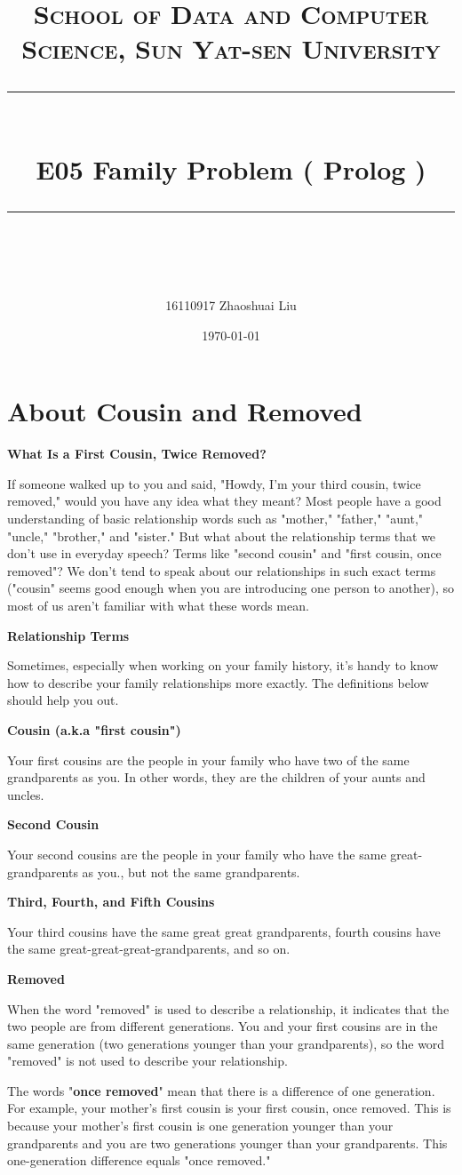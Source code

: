 ﻿\documentclass[a4paper, 11pt]{article}
\title{	
\normalfont \normalsize
\textsc{School of Data and Computer Science, Sun Yat-sen University} \\ [25pt] %
\rule{\textwidth}{0.5pt} \\[0.4cm] %
\huge  E05 Family Problem ( Prolog )\\ %
\rule{\textwidth}{2pt} \\[0.5cm] %
\author{16110917 Zhaoshuai Liu}
\date{\normalsize\today}
}
\begin{document}
\maketitle
\tableofcontents
\newpage
\section{About Cousin and Removed}
\textbf{What Is a First Cousin, Twice Removed?}

If someone walked up to you and said, "Howdy, I'm your third cousin, twice removed," would you have any idea what they meant? Most people have a good understanding of basic relationship words such as "mother," "father," "aunt," "uncle," "brother," and "sister." But what about the relationship terms that we don't use in everyday speech? Terms like "second cousin" and "first cousin, once removed"? We don't tend to speak about our relationships in such exact terms ("cousin" seems good enough when you are introducing one person to another), so most of us aren't familiar with what these words mean.

\textbf{Relationship Terms}

Sometimes, especially when working on your family history, it's handy to know how to describe your family relationships more exactly. The definitions below should help you out.

\textbf{Cousin (a.k.a "first cousin")}

Your first cousins are the people in your family who have two of the same grandparents as you. In other words, they are the children of your aunts and uncles.

\textbf{Second Cousin}

Your second cousins are the people in your family who have the same great-grandparents as you., but not the same grandparents.

\textbf{Third, Fourth, and Fifth Cousins}

Your third cousins have the same great great grandparents, fourth cousins have the same great-great-great-grandparents, and so on.

\textbf{Removed}

When the word "removed" is used to describe a relationship, it indicates that the two people are from different generations. You and your first cousins are in the same generation (two generations younger than your grandparents), so the word "removed" is not used to describe your relationship.

The words "\textbf{once removed}" mean that there is a difference of one generation. For example, your mother's first cousin is your first cousin, once removed. This is because your mother's first cousin is one generation younger than your grandparents and you are two generations younger than your grandparents. This one-generation difference equals "once removed."
\end{document}
